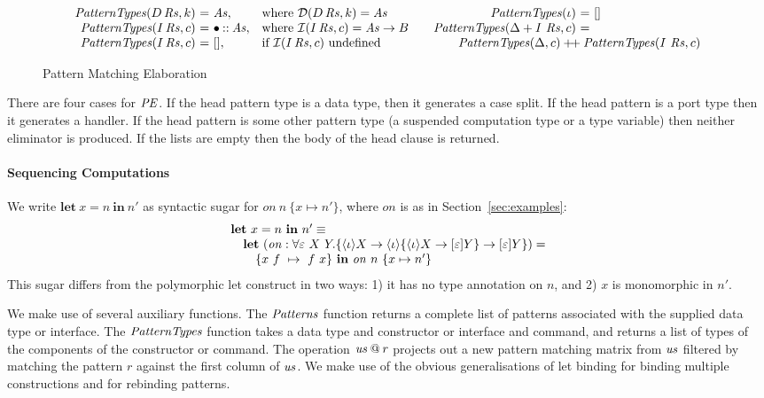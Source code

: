 \documentclass[12pt]{article}
\makeatletter
\newcommand\ba{\begin{array}}
\newcommand\ea{\end{array}}
\newcommand{\bstack}{\begin{array}[t]{@{}l@{}}}
\newcommand{\estack}{\end{array}}
\newenvironment{eqs}{\ba{@{}r@{~}c@{~}l@{}}}{\ea}
\newcommand{\key}[1]{\textbf{#1}} %
\newcommand{\var}{\mathit}        %
\newcommand{\thunk}[1]{\{{#1}\}}
\newcommand{\evd}{\varepsilon}
\newcommand{\effin}[1]{\langle {#1} \rangle}
\newcommand{\effout}[1]{[{#1}]}
\newcommand{\id}{\iota}
\makeatother
\begin{document}
\begin{figure*}
\[
\ba{@{}r@{~}c@{~}l@{\quad}l@{}}
\PatternTypes(D\,\Rs, k) &=& \As, & \text{where }\dcon(D\,\Rs, k) = \As \\
\PatternTypes(I\,\Rs, c) &=& \bullet \cons \As,   & \text{where }\icom(I\,\Rs, c) = \As \to B \\
\PatternTypes(I\,\Rs, c) &=& [], & \text{if }\icom(I\,\Rs, c)\text{ undefined} \\
\ea
\qquad
\begin{eqs}
\PatternTypes(\id) &=& \emptylist \\
\PatternTypes(\Delta + I~\Rs, c) &=& \\
\multicolumn{3}{@{\qquad}l@{}}{\PatternTypes(\Delta, c) \concat \PatternTypes(I~\Rs, c)} \\
\end{eqs}
\]

\caption{Pattern Matching Elaboration}
\label{fig:pattern-matching-elaboration}
\end{figure*}
%
There are four cases for $\mathit{PE}$. If the head pattern type is a data type,
then it generates a case split. If the head pattern is a port type
then it generates a handler. If the head pattern is some other pattern
type (a suspended computation type or a type variable) then neither
eliminator is produced. If the lists are empty then the body of the
head clause is returned.

\paragraph{Sequencing Computations}
We write $\key{let}~x=n~\key{in}~n'$ as syntactic sugar for
$\var{on}~n~\thunk{x \mapsto n'}$, where $\var{on}$ is as in
Section~\ref{sec:examples}:
%
\[
\bstack
\key{let}~x=n~\key{in}~n' \equiv \\
\quad \key{let}~
  (\var{on} :
    \forall \evd~X~Y.
       \thunk{\effin{\id}X \to \effin{\id}\thunk{\effin{\id}X \to \effout{\evd}Y} \to \effout{\evd}Y}) = \\
  \qquad \thunk{x~f~\mapsto~f~x}~\key{in}~\var{on}~n~\thunk{x \mapsto n'}
\estack
\]
This sugar differs from the polymorphic let construct in two ways: 1)
it has no type annotation on $n$, and 2) $x$ is monomorphic in $n'$.
\medskip

We make use of several auxiliary functions. The $\Patterns$ function
returns a complete list of patterns associated with the supplied data
type or interface. The $\PatternTypes$ function takes a data type and
constructor or interface and command, and returns a list of types of
the components of the constructor or command. The operation $\us \proj
r$ projects out a new pattern matching matrix from $\us$ filtered by
matching the pattern $r$ against the first column of $\us$. We make
use of the obvious generalisations of let binding for binding multiple
constructions and for rebinding patterns.
\end{document}
